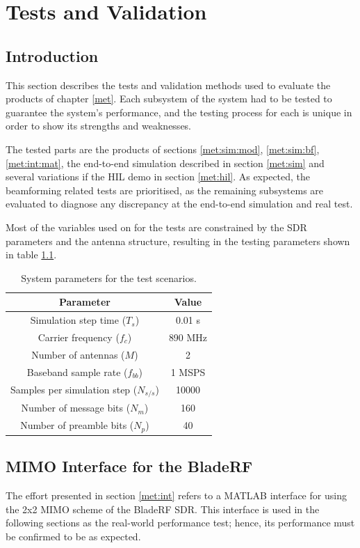 \documentclass[12pt,a4paper]{report}
\begin{document}
\chapter{Tests and Validation} \label{test}

\section{Introduction} \label{test:intro}
This section describes the tests and validation methods used to evaluate the products of chapter \ref{met}. Each subsystem of the system had to be tested to guarantee the system's performance, and the testing process for each is unique in order to show its strengths and weaknesses.

The tested parts are the products of sections \ref{met:sim:mod}, \ref{met:sim:bf}, \ref{met:int:mat}, the end-to-end simulation described in section \ref{met:sim} and several variations if the HIL demo in section \ref{met:hil}. As expected, the beamforming related tests are prioritised, as the remaining subsystems are evaluated to diagnose any discrepancy at the end-to-end simulation and real test.

Most of the variables used on for the tests are constrained by the SDR parameters and the antenna structure, resulting in the testing parameters shown in table \ref{tab:parameters:general}.

\begin{table}[h]
    \centering
    \begin{tabular}{c|c}
        Parameter &  Value\\ \hline
        Simulation step time ($T_s$) & 0.01 s \\
        Carrier frequency ($f_c$) & 890 MHz \\
        Number of antennas ($M$) & 2 \\
        Baseband sample rate ($f_{bb}$) & 1 MSPS \\
        Samples per simulation step ($N_{s/s}$) & 10000 \\
        Number of message bits ($N_m$) & 160 \\
        Number of preamble bits ($N_p$) & 40 \\
    \end{tabular}
    \caption{System parameters for the test scenarios.}
    \label{tab:parameters:general}
\end{table}

\newpage
\section{MIMO Interface for the BladeRF} \label{test:sdr}
The effort presented in section \ref{met:int} refers to a MATLAB interface for using the 2x2 MIMO scheme of the BladeRF SDR. This interface is used in the following sections as the real-world performance test; hence, its performance must be confirmed to be as expected. 
\end{document}
